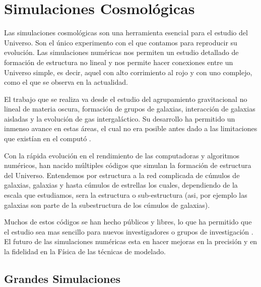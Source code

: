 
\chapter{Simulaciones Cosmológicas}
\label{chap:2 Sim}
\setcounter{equation}{0}

\noindent Las simulaciones cosmológicas son una herramienta esencial para el estudio del Universo. Son el único experimento con el que contamos para reproducir su evolución. Las simulaciones numéricas nos permiten un estudio detallado de formación de estructura no lineal y nos permite hacer conexiones entre un {\blues Universo simple, es decir, aquel} con alto corrimiento al rojo y con uno complejo, como el que se observa en la actualidad.

El trabajo que se realiza va desde el estudio del agrupamiento gravitacional no lineal de materia oscura, formación de grupos de galaxias, interacción de galaxias aisladas y la evolución de gas intergaláctico. Su desarrollo ha permitido un inmenso avance en estas áreas, el cual no era posible antes dado a las limitaciones que existían en el computó \cite{2001NewA....6...79S}.


{\blues Con la rápida evolución en el rendimiento de las computadoras y algoritmos numéricos, han nacido múltiples códigos que simulan la formación de estructura del Universo. Entendemos por estructura a la red complicada de cúmulos de galaxias, galaxias y hasta cúmulos de estrellas los cuales, dependiendo de la escala que estudiamos, sera la estructura o sub-estructura (asi, por ejemplo las galaxias son parte de la subestructura de los cúmulos de galaxias).

Muchos de estos códigos se han hecho públicos y libres, lo que ha permitido que el estudio sea mas sencillo para nuevos investigadores o grupos de investigación \cite{2021MNRAS.506.2871S}. El futuro de las simulaciones numéricas esta en hacer mejoras en la precisión y en la fidelidad en la Física de las técnicas de modelado.}

\newpage

\section{Grandes Simulaciones}

